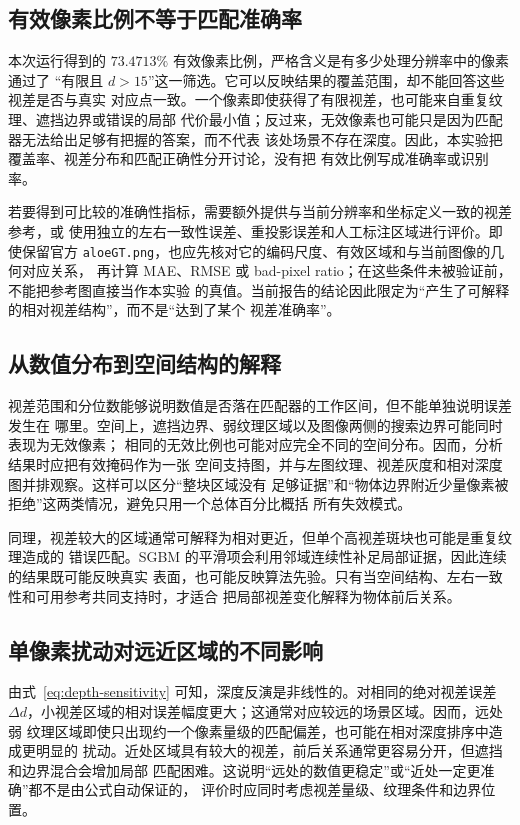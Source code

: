 \subsection{有效像素比例不等于匹配准确率}

本次运行得到的 $73.4713\%$ 有效像素比例，严格含义是有多少处理分辨率中的像素通过了
“有限且 $d>15$”这一筛选。它可以反映结果的覆盖范围，却不能回答这些视差是否与真实
对应点一致。一个像素即使获得了有限视差，也可能来自重复纹理、遮挡边界或错误的局部
代价最小值；反过来，无效像素也可能只是因为匹配器无法给出足够有把握的答案，而不代表
该处场景不存在深度。因此，本实验把覆盖率、视差分布和匹配正确性分开讨论，没有把
有效比例写成准确率或识别率。

若要得到可比较的准确性指标，需要额外提供与当前分辨率和坐标定义一致的视差参考，或
使用独立的左右一致性误差、重投影误差和人工标注区域进行评价。即使保留官方
\texttt{aloeGT.png}，也应先核对它的编码尺度、有效区域和与当前图像的几何对应关系，
再计算 MAE、RMSE 或 bad-pixel ratio；在这些条件未被验证前，不能把参考图直接当作本实验
的真值。当前报告的结论因此限定为“产生了可解释的相对视差结构”，而不是“达到了某个
视差准确率”。

\subsection{从数值分布到空间结构的解释}

视差范围和分位数能够说明数值是否落在匹配器的工作区间，但不能单独说明误差发生在
哪里。空间上，遮挡边界、弱纹理区域以及图像两侧的搜索边界可能同时表现为无效像素；
相同的无效比例也可能对应完全不同的空间分布。因而，分析结果时应把有效掩码作为一张
空间支持图，并与左图纹理、视差灰度和相对深度图并排观察。这样可以区分“整块区域没有
足够证据”和“物体边界附近少量像素被拒绝”这两类情况，避免只用一个总体百分比概括
所有失效模式。

同理，视差较大的区域通常可解释为相对更近，但单个高视差斑块也可能是重复纹理造成的
错误匹配。SGBM 的平滑项会利用邻域连续性补足局部证据，因此连续的结果既可能反映真实
表面，也可能反映算法先验。只有当空间结构、左右一致性和可用参考共同支持时，才适合
把局部视差变化解释为物体前后关系。

\subsection{单像素扰动对远近区域的不同影响}

由式~\eqref{eq:depth-sensitivity} 可知，深度反演是非线性的。对相同的绝对视差误差
$\Delta d$，小视差区域的相对误差幅度更大；这通常对应较远的场景区域。因而，远处弱
纹理区域即使只出现约一个像素量级的匹配偏差，也可能在相对深度排序中造成更明显的
扰动。近处区域具有较大的视差，前后关系通常更容易分开，但遮挡和边界混合会增加局部
匹配困难。这说明“远处的数值更稳定”或“近处一定更准确”都不是由公式自动保证的，
评价时应同时考虑视差量级、纹理条件和边界位置。

